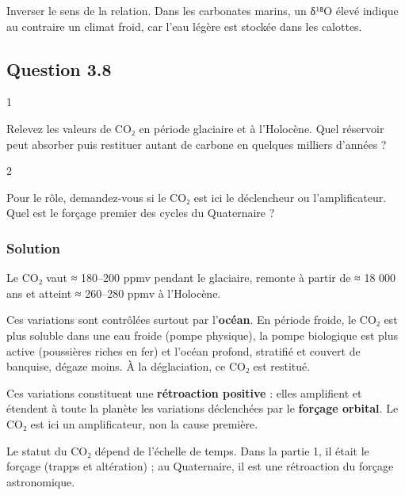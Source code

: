 \documentclass[11pt,a4paper]{article}
\begin{document}
\begin{piege}

Inverser le sens de la relation. Dans les carbonates marins, un δ¹⁸O élevé indique au contraire un climat froid, car l'eau légère est stockée dans les calottes.

\end{piege}

\hypertarget{question-3.8}{%
\subsection{Question 3.8}\label{question-3.8}}

\begin{indication}{1}

Relevez les valeurs de CO₂ en période glaciaire et à l'Holocène. Quel réservoir peut absorber puis restituer autant de carbone en quelques milliers d'années ?

\end{indication}

\begin{indication}{2}

Pour le rôle, demandez-vous si le CO₂ est ici le déclencheur ou l'amplificateur. Quel est le forçage premier des cycles du Quaternaire ?

\end{indication}

\hypertarget{solution-35}{%
\subsubsection{Solution}\label{solution-35}}

Le CO₂ vaut ≈ 180--200 ppmv pendant le glaciaire, remonte à partir de ≈ 18 000 ans et atteint ≈ 260--280 ppmv à l'Holocène.

Ces variations sont contrôlées surtout par l'\textbf{océan}. En période froide, le CO₂ est plus soluble dans une eau froide (pompe physique), la pompe biologique est plus active (poussières riches en fer) et l'océan profond, stratifié et couvert de banquise, dégaze moins. À la déglaciation, ce CO₂ est restitué.

Ces variations constituent une \textbf{rétroaction positive} : elles amplifient et étendent à toute la planète les variations déclenchées par le \textbf{forçage orbital}. Le CO₂ est ici un amplificateur, non la cause première.

\begin{methode}

Le statut du CO₂ dépend de l'échelle de temps. Dans la partie 1, il était le forçage (trapps et altération) ; au Quaternaire, il est une rétroaction du forçage astronomique.

\end{methode}
\end{document}
